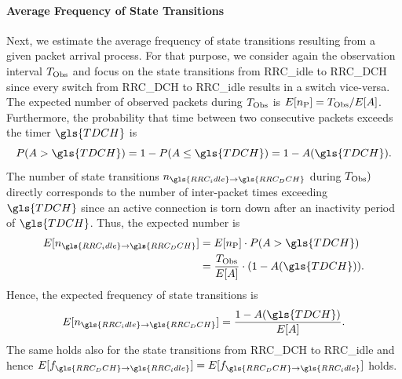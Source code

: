 \paragraph*{Average Frequency of State Transitions}

\newcommand{\NStateTransitionsIdleToDCH}{n_{\gls{RRC_idle}\rightarrow\gls{RRC_DCH}}}
\newcommand{\NStateTransitionsDCHToIdle}{n_{\gls{RRC_DCH}\rightarrow\gls{RRC_idle}}}
\newcommand{\fStateTransitionsIdleToDCH}{f_{\gls{RRC_idle}\rightarrow\gls{RRC_DCH}}}
\newcommand{\fStateTransitionsDCHToIdle}{f_{\gls{RRC_DCH}\rightarrow\gls{RRC_idle}}}

Next, we estimate the average frequency of state transitions resulting from a given packet arrival process.
For that purpose, we consider again the observation interval \(T_{\text{Obs}}\) and focus on the state transitions from \gls{RRC_idle} to \gls{RRC_DCH} since every switch from \gls{RRC_DCH} to \gls{RRC_idle} results in a switch vice-versa.
The expected number of observed packets during \(T_{\text{Obs}}\) is 
\(E[n_{\text{P}}]=T_{\text{Obs}}/E[A]\). 
Furthermore, the probability that time between two consecutive packets exceeds the timer \(\gls{TDCH}\) is
\begin{equation} 
P(\PacketIAT > \gls{TDCH}) = 1 - P(\PacketIAT \leq \gls{TDCH}) = 1 - \PacketIAT(\gls{TDCH}).
\end{equation} 
The number of state transitions \(\NStateTransitionsIdleToDCH\) during \(T_{\text{Obs}})\) directly corresponds to the number of inter-packet times exceeding \(\gls{TDCH}\) since an active connection is torn down after an inactivity period of \(\gls{TDCH}\).
Thus, the expected number is 
\begin{align}
\begin{split}
E[\NStateTransitionsIdleToDCH] & = E[\NObservedPackets] \cdot P(\PacketIAT > \gls{TDCH})\\
	& = \frac{\ObservationInterval}{E[\PacketIAT]}\cdot (1-\PacketIAT(\gls{TDCH})). 
\end{split}
\end{align} 
Hence, the expected frequency of state transitions is 
\begin{equation}
E[\NStateTransitionsIdleToDCH]=\frac{1-\PacketIAT(\gls{TDCH})}{E[\PacketIAT]}.
\end{equation}
The same holds also for the state transitions from \gls{RRC_DCH} to \gls{RRC_idle} and hence 
\(E[\fStateTransitionsDCHToIdle]=E[\fStateTransitionsDCHToIdle]\)
holds.

